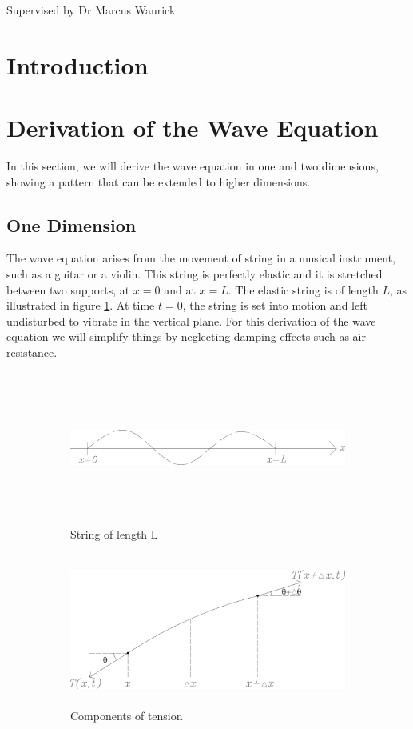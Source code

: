 \documentclass[12pt]{article}
\numberwithin{equation}{section}
\begin{document}
    \vspace*{5cm}
    Supervised by Dr Marcus Waurick
    \newpage
    \normalsize
    \tableofcontents
    \newpage
    
    \section{Introduction}
    
    
    \section{Derivation of the Wave Equation}
    In this section, we will derive the wave equation in one and two dimensions, showing a pattern that 
can be extended to higher dimensions.

\subsection{One Dimension}
The wave equation arises from the movement of string in a musical instrument, such as a guitar or a violin.
\cite{BoyDiP} This string is perfectly elastic and
it is stretched between two supports, at $x=0$ and at $x=L$. The elastic string is of length $L$, as
illustrated in figure \ref{fig:1a}. At time $t=0$, the string is set into motion and left undisturbed to vibrate in the
vertical plane. For this derivation of the wave equation we will simplify things by neglecting damping 
effects such as air resistance.

\begin{figure}[h]
    \begin{subfigure}{0.5\textwidth}
    \includegraphics[width=0.9\linewidth, height=5cm]{images/grafic-1} 
    \caption{String of length L}
    \label{fig:1a}
    \end{subfigure}
    \begin{subfigure}{0.5\textwidth}
    \includegraphics[width=0.9\linewidth, height=5cm]{images/grafic-2}
    \caption{Components of tension}
    \label{fig:1b}
    \end{subfigure}     
\caption{}
\label{fig:1}
\end{figure}
\end{document}

